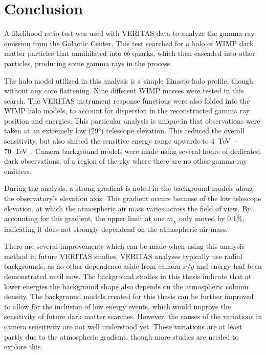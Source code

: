 \cleartooddpage[\thispagestyle{empty}]
\chapter{Conclusion}


A likelihood ratio test was used with VERITAS data to analyze the gamma-ray emission from the Galactic Center.
This test searched for a halo of WIMP dark matter particles that annihilated into $b\bar{b}$ quarks, which then cascaded into other particles, producing some gamma rays in the process.

The halo model utilized in this analysis is a simple Einasto halo profile, though without any core flattening.
Nine different WIMP masses were tested in this search.
The VERITAS instrument response functions were also folded into the WIMP halo models, to account for dispersion in the reconstructed gamma ray position and energies.
This particular analysis is unique in that observations were taken at an extremely low (\nicetilde{}\ang{29}) telescope elevation.
This reduced the overall sensitivity, but also shifted the sensitive energy range upwards to \SIrange{4}{70}{\TeV{}}.
Camera background models were made using several hours of dedicated dark observations, of a region of the sky where there are no other gamma-ray emitters.

During the analysis, a strong gradient is noted in the background models along the observatory's elevation axis.
This gradient occurs because of the low telescope elevation, at which the atmospheric air mass varies across the field of view.
By accounting for this gradient, the upper limit at one $m_{\chi}$ only moved by 0.1\%, indicating it does not strongly dependend on the atmospheric air mass.

There are several improvements which can be made when using this analysis method in future VERITAS studies.
VERITAS analyses typically use radial backgrounds, as no other dependence aside from camera $x$/$y$ and energy had been demonstrated until now.
The background studies in this thesis indicate that at lower energies the background shape also depends on the atmospheric column density.
The background models created for this thesis can be further improved to allow for the inclusion of low energy events, which would improve the sensitivity of future dark matter searches.
However, the causes of the variations in camera sensitivity are not well understood yet.
These variations are at least partly due to the atmospheric gradient, though more studies are needed to explore this.

